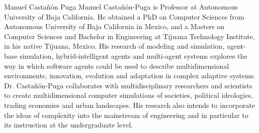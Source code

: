 \documentclass{ieeeaccess}
\begin{document}
\begin{IEEEbiography}{Manuel
    Casta\~{n}\'{o}n Puga} Manuel Casta\~{n}\'{o}n-Puga is Professor at Autonomous University of
  Baja California. He obtained a PhD on Computer Sciences from Autonomous
  University of Baja California in Mexico, and a Masters on Computer Sciences and
  Bachelor in Engineering at Tijuana Technology Institute, in his native Tijuana,
  Mexico. His research of modeling and simulation, agent-base simulation,
  hybrid-intelligent agents and multi-agent systems explores the way in which
  software agents could be used to describe multidimensional environments,
  innovation, evolution and adaptation in complex adaptive systems. Dr.
  Casta\~{n}\'{o}n-Puga collaborates with multidisciplinary researchers and scientists to
  create multidimensional computer simulations of societies, political ideologies,
  trading economies and urban landscapes. His research also intends to incorporate
  the ideas of complexity into the mainstream of engineering and in particular to
  its instruction at the undergraduate level. \end{IEEEbiography}
\end{document}
